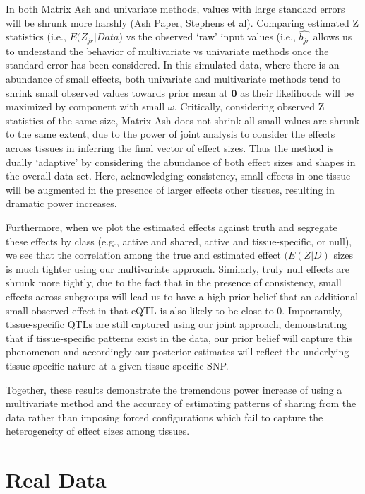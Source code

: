{In both Matrix Ash and univariate methods, values with large standard errors will be shrunk more harshly (Ash Paper, Stephens et al). Comparing estimated Z statistics (i.e., $E(Z_{jr}|Data$) vs the observed `raw' input values (i.e., $\hat{b_{jr}}$ allows us to understand the behavior of multivariate vs univariate methods once the standard error has been considered. In this simulated data, where there is an abundance of small effects, both univariate and multivariate methods tend to shrink small observed values towards prior mean at $\bm{0}$ as their likelihoods will be maximized by component with small $\omega$. Critically, considering observed Z statistics of the same size, Matrix Ash does not shrink all small values are shrunk to the same extent, due to the power of joint analysis to consider the effects across tissues in inferring the final vector of effect sizes. Thus the method is dually `adaptive' by considering the abundance of both effect sizes and shapes in the overall data-set.  Here, acknowledging consistency, small effects in one tissue will be augmented in the presence of larger effects  other tissues, resulting in dramatic power increases. 

Furthermore, when we plot the estimated effects against truth and segregate these effects by class (e.g., active and shared, active and tissue-specific, or null), we see that the correlation among the true and estimated effect $(E(Z|D)$ sizes is much tighter using our multivariate approach. Similarly, truly null effects are shrunk more tightly, due to the fact that in the presence of consistency, small effects across subgroups will lead us to have a high prior belief that an additional small observed effect in that eQTL is also likely to be close to 0. Importantly, tissue-specific QTLs are still captured using our joint approach, demonstrating that if tissue-specific patterns exist in the data, our prior belief will capture this phenomenon and accordingly our posterior estimates will reflect the underlying tissue-specific nature at a given tissue-specific SNP.

Together, these results demonstrate the tremendous power increase of using a multivariate method and the accuracy of estimating patterns of sharing from the data rather than imposing forced configurations which fail to capture the heterogeneity of effect sizes among tissues.


\section{Real Data}

}
